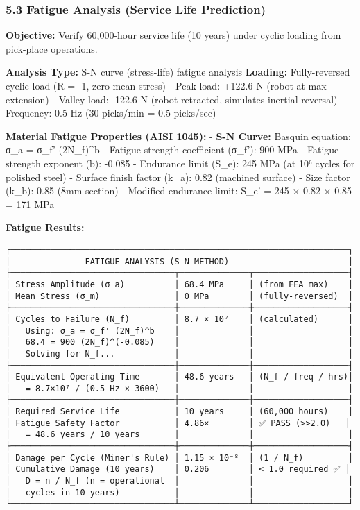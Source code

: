\documentclass[
]{article}
\begin{document}
\hypertarget{fatigue-analysis-service-life-prediction}{%
\subsubsection{5.3 Fatigue Analysis (Service Life
Prediction)}\label{fatigue-analysis-service-life-prediction}}

\textbf{Objective:} Verify 60,000-hour service life (10 years) under
cyclic loading from pick-place operations.

\textbf{Analysis Type:} S-N curve (stress-life) fatigue analysis
\textbf{Loading:} Fully-reversed cyclic load (R = -1, zero mean stress)
- Peak load: +122.6 N (robot at max extension) - Valley load: -122.6 N
(robot retracted, simulates inertial reversal) - Frequency: 0.5 Hz (30
picks/min = 0.5 picks/sec)

\textbf{Material Fatigue Properties (AISI 1045):} - \textbf{S-N Curve:}
Basquin equation: σ\_a = σ\_f' (2N\_f)\^{}b - Fatigue strength
coefficient (σ\_f'): 900 MPa - Fatigue strength exponent (b): -0.085 -
Endurance limit (S\_e): 245 MPa (at 10⁶ cycles for polished steel) -
Surface finish factor (k\_a): 0.82 (machined surface) - Size factor
(k\_b): 0.85 (8mm section) - Modified endurance limit: S\_e' = 245 ×
0.82 × 0.85 = 171 MPa

\textbf{Fatigue Results:}

\begin{verbatim}
┌────────────────────────────────────────────────────────────────────┐
│               FATIGUE ANALYSIS (S-N METHOD)                        │
├─────────────────────────────────┬──────────────┬───────────────────┤
│ Stress Amplitude (σ_a)          │ 68.4 MPa     │ (from FEA max)    │
│ Mean Stress (σ_m)               │ 0 MPa        │ (fully-reversed)  │
├─────────────────────────────────┼──────────────┼───────────────────┤
│ Cycles to Failure (N_f)         │ 8.7 × 10⁷    │ (calculated)      │
│   Using: σ_a = σ_f' (2N_f)^b    │              │                   │
│   68.4 = 900 (2N_f)^(-0.085)    │              │                   │
│   Solving for N_f...            │              │                   │
├─────────────────────────────────┼──────────────┼───────────────────┤
│ Equivalent Operating Time       │ 48.6 years   │ (N_f / freq / hrs)│
│   = 8.7×10⁷ / (0.5 Hz × 3600)   │              │                   │
├─────────────────────────────────┼──────────────┼───────────────────┤
│ Required Service Life           │ 10 years     │ (60,000 hours)    │
│ Fatigue Safety Factor           │ 4.86×        │ ✅ PASS (>>2.0)   │
│   = 48.6 years / 10 years       │              │                   │
├─────────────────────────────────┼──────────────┼───────────────────┤
│ Damage per Cycle (Miner's Rule) │ 1.15 × 10⁻⁸  │ (1 / N_f)         │
│ Cumulative Damage (10 years)    │ 0.206        │ < 1.0 required ✅ │
│   D = n / N_f (n = operational  │              │                   │
│   cycles in 10 years)           │              │                   │
└─────────────────────────────────┴──────────────┴───────────────────┘
\end{verbatim}
\end{document}
